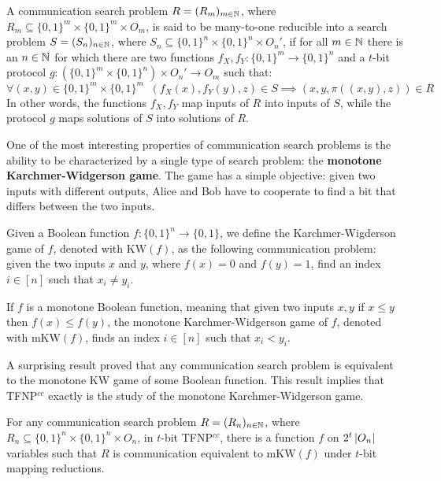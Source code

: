 \begin{definition}
 A communication search problem $R = (R_m)_{m \in \mathbb{N}}$, where $R_m \subseteq \{0,1\}^m \times \{0,1\}^m \times O_m$, is said to be many-to-one reducible into a search problem $S = (S_n)_{n \in \mathbb{N}}$, where $S_n \subseteq \{0,1\}^n \times \{0,1\}^n \times O_n'$, if for all $m \in \mathbb{N}$ there is an $n \in \mathbb{N}$ for which there are two functions $f_X, f_Y : \{0,1\}^m \to \{0,1\}^n$ and a $t$-bit protocol $g : (\{0,1\}^m \times \{0,1\}^n) \times O_n' \to O_m$ such that:
    \[\forall (x,y) \in \{0,1\}^m \times \{0,1\}^m \;\; (f_X(x), f_Y(y), z) \in S \implies (x, y, \pi((x,y), z)) \in R\]
 In other words, the functions $f_X,f_Y$ map inputs of $R$ into inputs of $S$, while the protocol $g$ maps solutions of $S$ into solutions of $R$. 
\end{definition}

One of the most interesting properties of communication search problems is the ability to be characterized by a single type of search problem: the \textbf{monotone Karchmer-Widgerson game}. The game has a simple objective: given two inputs with different outputs, Alice and Bob have to cooperate to find a bit that differs between the two inputs.

\begin{definition}
 Given a Boolean function $f : \{0, 1\}^n \to \{0, 1\}$, we define the Karchmer-Wigderson game of $f$, denoted with $\mathrm{KW}(f)$, as the following communication problem: given the two inputs $x$ and $y$, where $f(x) = 0$ and $f(y) = 1$, find an index $i \in [n]$ such that $x_i \neq y_i$.

 If $f$ is a monotone Boolean function, meaning that given two inputs $x,y$ if $x \leq y$ then $f(x) \leq f(y)$, the monotone Karchmer-Widgerson game of $f$, denoted with $\mathrm{mKW}(f)$, finds an index $i \in [n]$ such that $x_i < y_i$.
\end{definition}

A surprising result \cite{span_programs, adventures_monotone_tfnp} proved that any communication search problem is equivalent to the monotone KW game of some Boolean function. This result implies that \textsf{TFNP}$^{cc}$ exactly is the study of the monotone Karchmer-Widgerson game.

\begin{lemma}
 For any communication search problem $R = (R_n)_{n \in \mathbb{N}}$, where $R_n \subseteq \{0,1\}^n \times \{0,1\}^n \times O_n$, in $t$-bit \textsf{TFNP}$^{cc}$, there is a function $f$ on $2^t\left|O_n\right|$ variables such that $R$ is communication equivalent to $\mathrm{mKW}(f)$ under $t$-bit mapping reductions.
\end{lemma}

